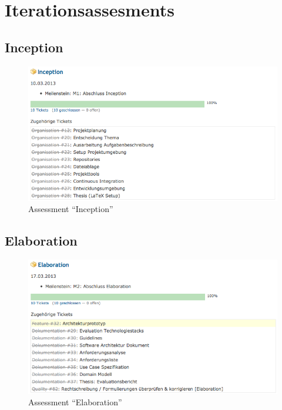 \section{Iterationsassesments}
\subsection*{Inception}
\begin{figure}[H]
	\centering
	\includegraphics[width=13cm]{content/appendix/projectmanagement/images/assessment/inception.png}
	\caption{Assessment ``Inception''}
\end{figure}

\subsection*{Elaboration}
\begin{figure}[H]
	\centering
	\includegraphics[width=13cm]{content/appendix/projectmanagement/images/assessment/elaboration.png}
	\caption{Assessment ``Elaboration''}
\end{figure}

